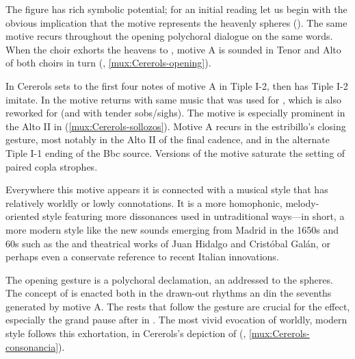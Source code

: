 
The figure has rich symbolic potential; for an initial reading let us begin with
the obvious implication that the motive represents the heavenly spheres
().
The same motive recurs throughout the opening polychoral dialogue on the same
words.
When the choir exhorts the heavens to , motive A is
sounded in Tenor and Alto of both choirs in turn (,
\cref{mux:Cererols-opening}).


In  Cererols sets  to the
first four notes of motive A in Tiple I-2, then has Tiple I-2 imitate.
In  the motive returns with same music that was used for
, which is also reworked for  (and with tender sobs/sighs).
The motive is especially prominent in the Alto II in 
(\cref{mux:Cererols-sollozos}). 
Motive A recurs in the estribillo's closing gesture, most notably in the Alto II
of the final cadence, and in the alternate Tiple I-1 ending of the Bbc source.
Versions of the motive saturate the setting of paired copla strophes.


Everywhere this motive appears it is connected with a musical style that has
relatively worldly or lowly connotations.
It is a more homophonic, melody-oriented style featuring more dissonances used
in untraditional ways---in short, a more modern style like the new sounds
emerging from Madrid in the 1650s and 60s such as the  and
theatrical works of Juan Hidalgo and Cristóbal Galán, or perhaps even a
conservate reference to recent Italian innovations.%
    \citXXX[examples]

The opening gesture is a polychoral declamation, an  addressed to
the spheres.
The concept of  is enacted both in the drawn-out rhythms an
din the sevenths generated by motive A.
The rests that follow the gesture are crucial for the effect, especially the
grand pause after  in .
The most vivid evocation of worldly, modern style follows this exhortation, in
Cererols's depiction of  (,
\cref{mux:Cererols-consonancia}).

